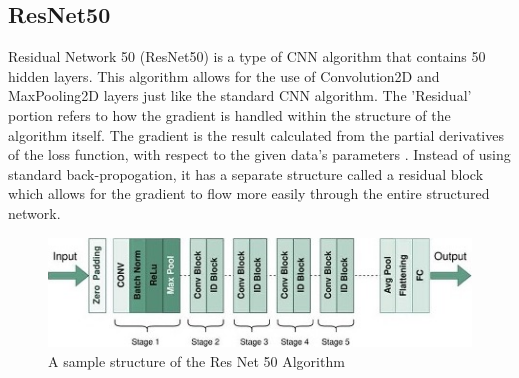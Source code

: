 \subsection{ResNet50}

Residual Network 50 (ResNet50) is a type of CNN algorithm that contains 50 hidden layers. 
This algorithm allows for the use of Convolution2D and MaxPooling2D layers just like the standard CNN algorithm.
The 'Residual' portion refers to how the gradient is handled within the structure of the algorithm itself.
The gradient is the result calculated from the partial derivatives of the loss function, with respect to the given data's parameters \cite{Gradient}.
Instead of using standard back-propogation, it has a separate structure called a residual block which allows for the gradient to flow more easily through the entire structured network\cite{RN50}.

\begin{figure}[h]
	\centering
	\includegraphics[scale=0.5]{ResNet_structure.jpg}
	\caption{A sample structure of the Res Net 50 Algorithm}
	\label{fig:figure5}
\end{figure}

